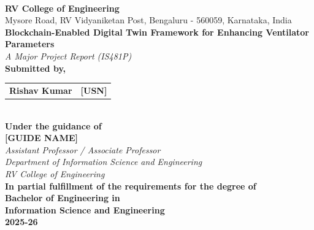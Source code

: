 \documentclass[12pt,a4paper,oneside]{report}
\begin{document}
\begin{titlepage}
\thispagestyle{empty}
\begin{center}
\vspace*{0.4in}
{\large\textbf{RV College of Engineering\textsuperscript{\textregistered}}}\\
{\small Mysore Road, RV Vidyaniketan Post, Bengaluru - 560059, Karnataka, India}\\
\vspace{0.6in}
{\Huge\bfseries Blockchain-Enabled Digital Twin Framework for Enhancing Ventilator Parameters}\\[0.3in]
{\Large\itshape A Major Project Report (IS481P)}\\[0.6in]
{\Large\bfseries Submitted by,}\\[0.3in]
\begin{tabular}{ll}
\textbf{Rishav Kumar} \hspace{2.2in} & \textbf{[USN]}
\end{tabular}\\[0.9in]
{\Large\bfseries Under the guidance of}\\[0.3in]
{\large\textbf{[GUIDE NAME]}}\\
\textit{Assistant Professor / Associate Professor}\\
\textit{Department of Information Science and Engineering}\\
\textit{RV College of Engineering}\\[0.7in]
{\large\bfseries In partial fulfillment of the requirements for the degree of}\\
{\large\bfseries Bachelor of Engineering in}\\
{\large\bfseries Information Science and Engineering}\\[0.2in]
{\Large\bfseries 2025-26}
\end{center}
\end{titlepage}
\end{document}
